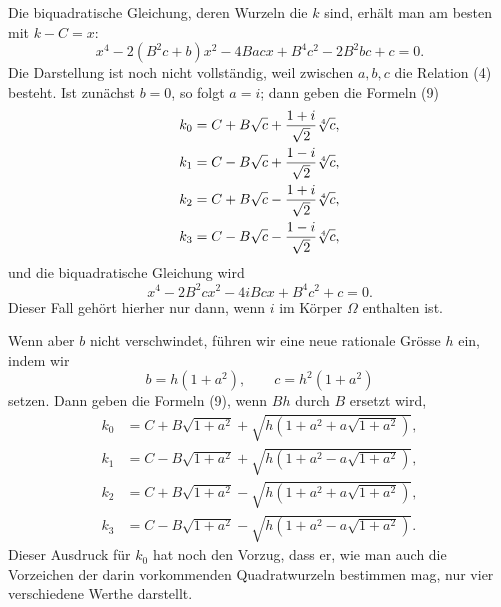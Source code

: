 \documentclass[11pt]{article}
\begin{document}
Die biquadratische Gleichung, deren Wurzeln die $k$ sind, erh\"alt man am besten mit $k-C=x$:
\begin{equation}\tag{11}
  x^4-2(B^2c+b)x^2-4Bacx+B^4c^2-2B^2bc+c=0.
\end{equation}
Die Darstellung ist noch nicht vollst\"andig, weil zwischen $a,b,c$ die Relation (4) besteht. Ist zun\"achst $b=0$, so folgt $a=i$; dann geben die Formeln (9)
\[
\begin{aligned}
 k_0&=C+B\sqrt c+{1+i\over\sqrt2}\sqrt[4]{c},\\
 k_1&=C-B\sqrt c+{1-i\over\sqrt2}\sqrt[4]{c},\\
 k_2&=C+B\sqrt c-{1+i\over\sqrt2}\sqrt[4]{c},\\
 k_3&=C-B\sqrt c-{1-i\over\sqrt2}\sqrt[4]{c},
\end{aligned}
\]
und die biquadratische Gleichung wird
\[
  x^4-2B^2cx^2-4iBcx+B^4c^2+c=0.
\]
Dieser Fall geh\"ort hierher nur dann, wenn $i$ im K\"orper $\Omega$ enthalten ist.

Wenn aber $b$ nicht verschwindet, f\"uhren wir eine neue rationale Gr\"osse $h$ ein, indem wir
\[
  b=h(1+a^2),\qquad c=h^2(1+a^2)
\]
setzen. Dann geben die Formeln (9), wenn $Bh$ durch $B$ ersetzt wird,
\begin{equation}\tag{12}
\begin{aligned}
 k_0&=C+B\sqrt{1+a^2}+\sqrt{h(1+a^2+a\sqrt{1+a^2})},\\
 k_1&=C-B\sqrt{1+a^2}+\sqrt{h(1+a^2-a\sqrt{1+a^2})},\\
 k_2&=C+B\sqrt{1+a^2}-\sqrt{h(1+a^2+a\sqrt{1+a^2})},\\
 k_3&=C-B\sqrt{1+a^2}-\sqrt{h(1+a^2-a\sqrt{1+a^2})}.
\end{aligned}
\end{equation}
Dieser Ausdruck f\"ur $k_0$ hat noch den Vorzug, dass er, wie man auch die Vorzeichen der darin vorkommenden Quadratwurzeln bestimmen mag, nur vier verschiedene Werthe darstellt.
\end{document}
